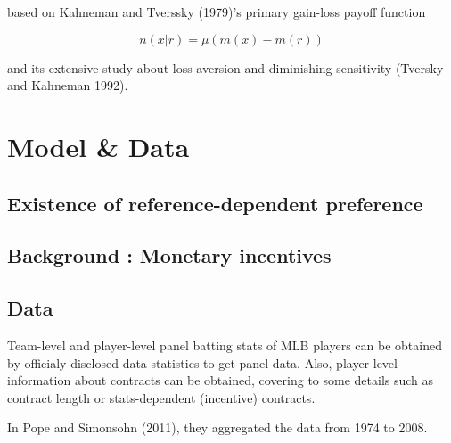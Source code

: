 \documentclass{jsarticle}[12pt]
\begin{document}
based on Kahneman and Tverssky (1979)'s primary gain-loss payoff function

\[n(x|r) = \mu ( m(x) - m(r) ) \]

and its extensive study about loss aversion and diminishing sensitivity (Tversky and Kahneman 1992).

\section{Model \& Data}

 \subsection{Existence of reference-dependent preference}
 
 
 
 \subsection{Background : Monetary incentives}
 
 
 
 \subsection{Data}
 
 Team-level and player-level panel batting stats of MLB players can be obtained by officialy disclosed data statistics to get panel data. Also, player-level information about contracts can be obtained, covering to some details such as contract length or stats-dependent (incentive) contracts.
 
 In Pope and Simonsohn (2011), they aggregated the data from 1974 to 2008. 
\end{document}
